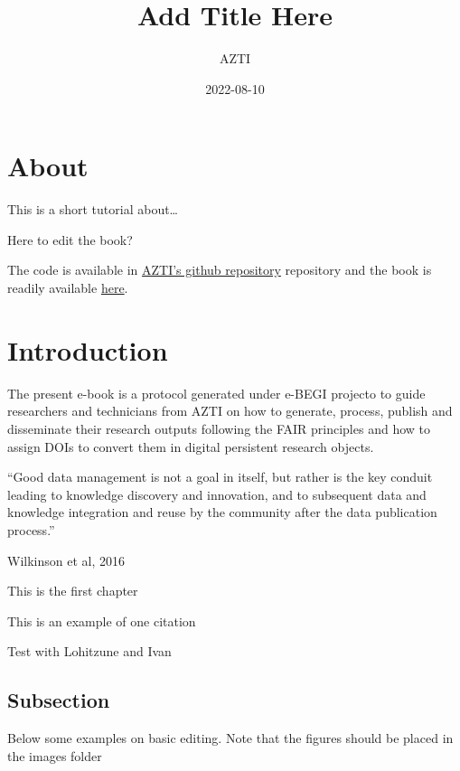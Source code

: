 \documentclass[
]{book}
\title{Add Title Here}
\author{AZTI}
\date{2022-08-10}
\begin{document}
\maketitle

{
\setcounter{tocdepth}{1}
\tableofcontents
}
\hypertarget{about}{%
\chapter*{About}\label{about}}

This is a short tutorial about\ldots{}

Here to edit the book?

The code is available in \href{https://github.com/Fundacion-AZTI/ebegi_quickguide2DOIs}{AZTI's github repository} repository and the book is readily available \href{https://fundacion-azti.github.io/ebegi_quickguide2DOIs/}{here}.

\hypertarget{introduction}{%
\chapter{Introduction}\label{introduction}}

The present e-book is a protocol generated under e-BEGI projecto to guide researchers and technicians from AZTI on how to generate, process, publish and disseminate their research outputs following the FAIR principles and how to assign DOIs to convert them in digital persistent research objects.

``Good data management is not a goal in itself, but rather is the key conduit leading to knowledge discovery and innovation, and to subsequent data and knowledge integration and reuse by the community after the data publication process.''

Wilkinson et al, 2016

This is the first chapter

This is an example of one citation \citep{citores_etal_2020}

Test with Lohitzune and Ivan

\hypertarget{subsection}{%
\section{Subsection}\label{subsection}}

Below some examples on basic editing. Note that the figures should be placed in the images folder
\end{document}
